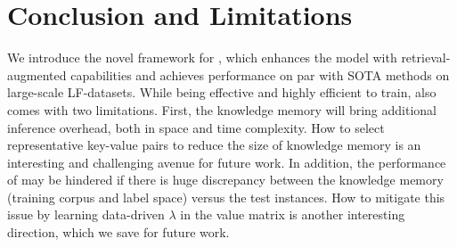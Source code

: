 
\section{Conclusion and Limitations}
\label{sec:conclusion}
We introduce the novel \RAEXMC framework for \XMC, which enhances the \DE model with retrieval-augmented capabilities and achieves performance on par with SOTA methods on large-scale LF-\XMC datasets.
While being effective and highly efficient to train, \RAEXMC also comes with two limitations.
First, the knowledge memory will bring additional inference overhead, both in space and time complexity.
How to select representative key-value pairs to reduce the size of knowledge memory is an interesting and challenging avenue for future work.
In addition, the performance of \RAEXMC may be hindered if there is huge discrepancy between the knowledge memory (training corpus and label space) versus the test instances.
How to mitigate this issue by learning data-driven $\lambda$ in the value matrix is another interesting direction, which we save for future work.

     
